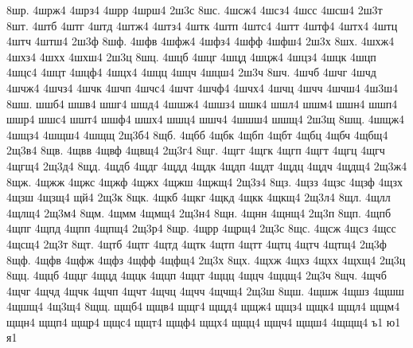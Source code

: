 {8шр.
4шрж4
4шрз4
4шрр
4шрш4
2ш3с
8шс.
4шсж4
4шсз4
4шсс
4шсш4
2ш3т
8шт.
4штб
4штг
4штд
4штж4
4штз4
4штк
4штп
4штс4
4штт
4штф4
4штх4
4штц
4штч
4штш4
2ш3ф
8шф.
4шфв
4шфж4
4шфз4
4шфф
4шфш4
2ш3х
8шх.
4шхж4
4шхз4
4шхх
4шхш4
2ш3ц
8шц.
4шцб
4шцг
4шцд
4шцж4
4шцз4
4шцк
4шцп
4шцс4
4шцт
4шцф4
4шцх4
4шцц
4шцч
4шцш4
2ш3ч
8шч.
4шчб
4шчг
4шчд
4шчж4
4шчз4
4шчк
4шчп
4шчс4
4шчт
4шчф4
4шчх4
4шчц
4шчч
4шчш4
4ш3ш4
8шш.
шшб4
шшв4
шшг4
шшд4
4шшж4
4шшз4
шшк4
шшл4
шшм4
шшн4
шшп4
шшр4
шшс4
шшт4
шшф4
шшх4
шшц4
шшч4
4шшш4
шшщ4
2ш3щ
8шщ.
4шщж4
4шщз4
4шщш4
4шщщ
2щ3б4
8щб.
4щбб
4щбк
4щбп
4щбт
4щбц
4щбч
4щбщ4
2щ3в4
8щв.
4щвв
4щвф
4щвщ4
2щ3г4
8щг.
4щгг
4щгк
4щгп
4щгт
4щгц
4щгч
4щгщ4
2щ3д4
8щд.
4щдб
4щдг
4щдд
4щдк
4щдп
4щдт
4щдц
4щдч
4щдщ4
2щ3ж4
8щж.
4щжж
4щжс
4щжф
4щжх
4щжш
4щжщ4
2щ3з4
8щз.
4щзз
4щзс
4щзф
4щзх
4щзш
4щзщ4
щй4
2щ3к
8щк.
4щкб
4щкг
4щкд
4щкк
4щкщ4
2щ3л4
8щл.
4щлл
4щлщ4
2щ3м4
8щм.
4щмм
4щмщ4
2щ3н4
8щн.
4щнн
4щнщ4
2щ3п
8щп.
4щпб
4щпг
4щпд
4щпп
4щпщ4
2щ3р4
8щр.
4щрр
4щрщ4
2щ3с
8щс.
4щсж
4щсз
4щсс
4щсщ4
2щ3т
8щт.
4щтб
4щтг
4щтд
4щтк
4щтп
4щтт
4щтц
4щтч
4щтщ4
2щ3ф
8щф.
4щфв
4щфж
4щфз
4щфф
4щфщ4
2щ3х
8щх.
4щхж
4щхз
4щхх
4щхщ4
2щ3ц
8щц.
4щцб
4щцг
4щцд
4щцк
4щцп
4щцт
4щцц
4щцч
4щцщ4
2щ3ч
8щч.
4щчб
4щчг
4щчд
4щчк
4щчп
4щчт
4щчц
4щчч
4щчщ4
2щ3ш
8щш.
4щшж
4щшз
4щшш
4щшщ4
4щ3щ4
8щщ.
щщб4
щщв4
щщг4
щщд4
щщж4
щщз4
щщк4
щщл4
щщм4
щщн4
щщп4
щщр4
щщс4
щщт4
щщф4
щщх4
щщц4
щщч4
щщш4
4щщщ4
ъ1
ю1
я1
}

\endinput
